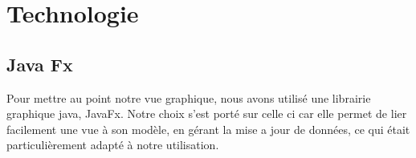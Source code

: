 \section{Technologie}
\subsection{Java Fx}
\par Pour mettre au point notre vue graphique, nous avons utilisé une librairie graphique java, JavaFx. Notre choix s'est porté sur celle ci car elle permet de lier facilement une vue à son modèle, en gérant la mise a jour de données, ce qui était particulièrement adapté à notre utilisation.